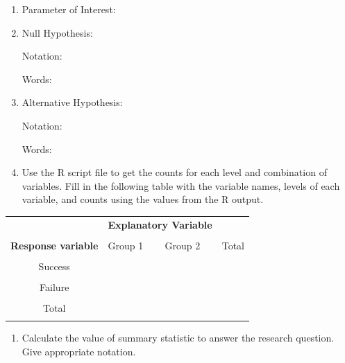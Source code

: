 \documentclass[
]{report}
\providecommand{\tightlist}{%
  \setlength{\itemsep}{0pt}\setlength{\parskip}{0pt}}
\begin{document}
\begin{enumerate}
\def\labelenumi{\alph{enumi}.}
\item
  Parameter of Interest:
  \vspace{0.3in}
\item
  Null Hypothesis:

  Notation:
  \vspace{0.3in}

  Words:
  \vspace{0.5in}
\item
  Alternative Hypothesis:

  Notation:
  \vspace{0.3in}

  Words:
  \vspace{0.5in}
\item
  Use the R script file to get the counts for each level and combination of variables. Fill in the following table with the variable names, levels of each variable, and counts using the values from the R output.
\end{enumerate}

\begingroup
\setlength{\tabcolsep}{14pt}
\renewcommand{\arraystretch}{2}
\begin{center}
\begin{tabular}{|c|p{1in}|p{1in}|p{1in}|}
\hline
 & \multicolumn{2}{|c|}{\textbf{Explanatory Variable}} & \\ 
 & \multicolumn{2}{|c|}{ } & \\ \hline
\textbf{Response variable} & Group 1 & Group 2 & Total \\
 & & & \\ \hline
 Success & & & \\
 & & & \\ \hline
 Failure & & & \\
 & & & \\ \hline
 Total & & & \\
 & & & \\ \hline
\end{tabular}
\end{center}
\endgroup

\begin{enumerate}
\def\labelenumi{\alph{enumi}.}
\setcounter{enumi}{3}
\tightlist
\item
  Calculate the value of summary statistic to answer the research question. Give appropriate notation.
\end{enumerate}

\vspace{0.4in}
\end{document}
